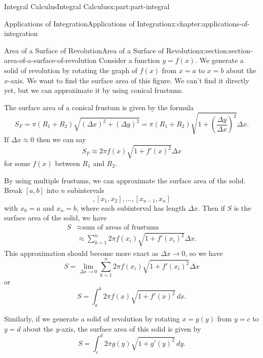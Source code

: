 \documentclass[twoside,10pt,]{book}
\numberwithin{equation}{part}
\newcommand{\amp}{&}
\begin{document}
\begin{partptx}{Integral Calculus}{}{Integral Calculus}{}{}{x:part:part-integral}
\begin{chapterptx}{Applications of Integration}{}{Applications of Integration}{}{}{x:chapter:applications-of-integration}
\typeout{************************************************}
%
\begin{sectionptx}{Area of a Surface of Revolution}{}{Area of a Surface of Revolution}{}{}{x:section:section-area-of-a-surface-of-revolution}
Consider a function \(y=f(x)\). We generate a solid of revolution by rotating the graph of \(f(x)\) from \(x=a\) to \(x=b\) about the \(x\)-axis. We want to find the surface area of this figure. We can't find it directly yet, but we can approximate it by using conical frustums.%
\par
The surface area of a conical frustum is given by the formula%
\begin{equation*}
S_{F}=\pi(R_{1}+R_{2})\sqrt{(\Delta x)^{2}+(\Delta y)^{2}}=\pi(R_{1}+R_{2})\sqrt{1+\left(\frac{\Delta y}{\Delta x}\right)^{2}}\Delta x.
\end{equation*}
If \(\Delta x\approx0\) then we can say%
\begin{equation*}
S_{F}\approx2\pi f(x)\sqrt{1+f'(x)^{2}}\Delta x
\end{equation*}
for some \(f(x)\) between \(R_{1}\) and \(R_{2}\).%
\par
By using multiple frustums, we can approximate the surface area of the solid. Break \([a,b]\) into \(n\) subintervals%
\begin{equation*}
[x_{0},x_{1}],[x_{1},x_{2}],\ldots,[x_{n-1},x_{n}]
\end{equation*}
with \(x_{0}=a\) and \(x_{n}=b\), where each subinterval has length \(\Delta x\). Then if \(S\) is the surface area of the solid, we have%
\begin{align*}
S\amp\approx\text{sum of areas of frustums}\\
\amp\approx\sum_{k=1}^{n}2\pi f(x_{i})\sqrt{1+f'(x_{i})^{2}}\Delta x.
\end{align*}
This approximation should become more exact as \(\Delta x \to 0\), so we have%
\begin{equation*}
S=\lim_{\Delta x\to0}\sum_{k=1}^{n}2\pi f(x_{i})\sqrt{1+f'(x_{i})^{2}}\Delta x
\end{equation*}
or%
\begin{equation*}
S=\int_{a}^{b}2\pi f(x)\sqrt{1+f'(x)^{2}}\,dx.
\end{equation*}
%
\par
Similarly, if we generate a solid of revolution by rotating \(x=g(y)\) from \(y=c\) to \(y=d\) about the \(y\)-axis, the surface area of this solid is given by%
\begin{equation*}
S=\int_{c}^{d}2\pi g(y)\sqrt{1+g'(y)^{2}}\,dy.

\end{equation*}
\end{sectionptx}
\end{chapterptx}
\end{partptx}
\end{document}
